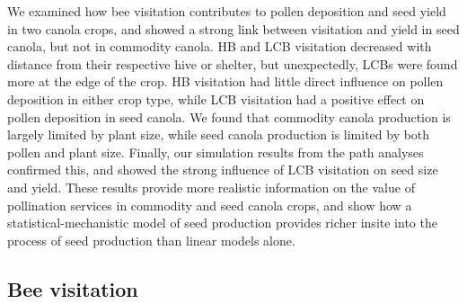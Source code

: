 \documentclass[12pt]{article} %
\begin{document}
We examined how bee visitation contributes to pollen deposition and seed yield in two canola crops, and showed a strong link between visitation and yield in seed canola, but not in commodity canola.
HB and LCB visitation decreased with distance from their respective hive or shelter, but unexpectedly, LCBs were found more at the edge of the crop.
HB visitation had little direct influence on pollen deposition in either crop type, while LCB visitation had a positive effect on pollen deposition in seed canola.
We found that commodity canola production is largely limited by plant size, while seed canola production is limited by both pollen and plant size.
Finally, our simulation results from the path analyses confirmed this, and showed the strong influence of LCB visitation on seed size and yield.
These results provide more realistic information on the value of pollination services in commodity and seed canola crops, and show how a statistical-mechanistic model of seed production provides richer insite into the process of seed production than linear models alone.

\subsection*{Bee visitation} 
\end{document}

